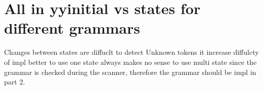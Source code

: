 \documentclass[letterpaper]{article}
\begin{document}
\section{All in yyinitial vs states for different grammars}

Changes between states are diffuclt to detect Unknown tokens
it increase diffulcty of impl
better to use one state
always makes no sense to use multi state since the grammar is checked
during the scanner, therefore the grammar should be impl in part 2.
\end{document}
